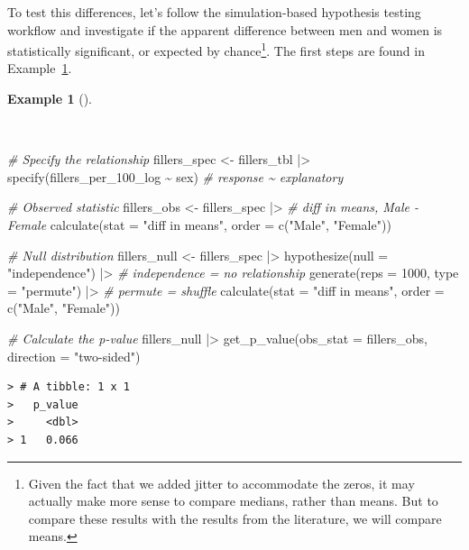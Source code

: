 \documentclass[
  letterpaper,
]{latex/krantz}
\newenvironment{Shaded}{\begin{snugshade}}{\end{snugshade}}
\newcommand{\AttributeTok}[1]{\textcolor[rgb]{0.00,0.00,0.00}{#1}}
\newcommand{\CommentTok}[1]{\textcolor[rgb]{0.00,0.00,0.00}{\textit{#1}}}
\newcommand{\DecValTok}[1]{\textcolor[rgb]{0.00,0.00,0.00}{#1}}
\newcommand{\FunctionTok}[1]{\textcolor[rgb]{0.00,0.00,0.00}{#1}}
\newcommand{\NormalTok}[1]{\textcolor[rgb]{0.00,0.00,0.00}{#1}}
\newcommand{\OtherTok}[1]{\textcolor[rgb]{0.00,0.00,0.00}{#1}}
\newcommand{\SpecialCharTok}[1]{\textcolor[rgb]{0.00,0.00,0.00}{#1}}
\newcommand{\StringTok}[1]{\textcolor[rgb]{0.00,0.00,0.00}{#1}}
\theoremstyle{definition}
\newtheorem{example}{Example}[chapter]
\theoremstyle{remark}
\begin{document}
To test this differences, let's follow the simulation-based hypothesis
testing workflow and investigate if the apparent difference between men
and women is statistically significant, or expected by
chance\footnote{Given the fact that we added jitter to accommodate the
  zeros, it may actually make more sense to compare medians, rather than
  means. But to compare these results with the results from the
  literature, we will compare means.}. The first steps are found in
Example~\ref{exm-ida-num-bi-sex-null}.

\begin{example}[]\protect\hypertarget{exm-ida-num-bi-sex-null}{}\label{exm-ida-num-bi-sex-null}

~

\begin{Shaded}
\begin{Highlighting}[]
\CommentTok{\# Specify the relationship}
\NormalTok{fillers\_spec }\OtherTok{\textless{}{-}}
\NormalTok{  fillers\_tbl }\SpecialCharTok{|\textgreater{}}
  \FunctionTok{specify}\NormalTok{(fillers\_per\_100\_log }\SpecialCharTok{\textasciitilde{}}\NormalTok{ sex) }\CommentTok{\# response \textasciitilde{} explanatory}

\CommentTok{\# Observed statistic}
\NormalTok{fillers\_obs }\OtherTok{\textless{}{-}}
\NormalTok{  fillers\_spec }\SpecialCharTok{|\textgreater{}}
  \CommentTok{\# diff in means, Male {-} Female}
  \FunctionTok{calculate}\NormalTok{(}\AttributeTok{stat =} \StringTok{"diff in means"}\NormalTok{, }\AttributeTok{order =} \FunctionTok{c}\NormalTok{(}\StringTok{"Male"}\NormalTok{, }\StringTok{"Female"}\NormalTok{))}

\CommentTok{\# Null distribution}
\NormalTok{fillers\_null }\OtherTok{\textless{}{-}}
\NormalTok{  fillers\_spec }\SpecialCharTok{|\textgreater{}}
  \FunctionTok{hypothesize}\NormalTok{(}\AttributeTok{null =} \StringTok{"independence"}\NormalTok{) }\SpecialCharTok{|\textgreater{}} \CommentTok{\# independence = no relationship}
  \FunctionTok{generate}\NormalTok{(}\AttributeTok{reps =} \DecValTok{1000}\NormalTok{, }\AttributeTok{type =} \StringTok{"permute"}\NormalTok{) }\SpecialCharTok{|\textgreater{}} \CommentTok{\# permute = shuffle}
  \FunctionTok{calculate}\NormalTok{(}\AttributeTok{stat =} \StringTok{"diff in means"}\NormalTok{, }\AttributeTok{order =} \FunctionTok{c}\NormalTok{(}\StringTok{"Male"}\NormalTok{, }\StringTok{"Female"}\NormalTok{))}

\CommentTok{\# Calculate the p{-}value}
\NormalTok{fillers\_null }\SpecialCharTok{|\textgreater{}}
  \FunctionTok{get\_p\_value}\NormalTok{(}\AttributeTok{obs\_stat =}\NormalTok{ fillers\_obs, }\AttributeTok{direction =} \StringTok{"two{-}sided"}\NormalTok{)}
\end{Highlighting}
\end{Shaded}

\begin{verbatim}
> # A tibble: 1 x 1
>   p_value
>     <dbl>
> 1   0.066
\end{verbatim}

\end{example}
\end{document}
